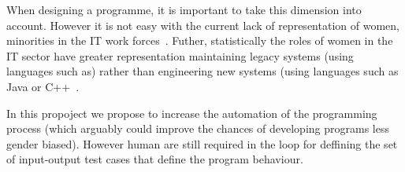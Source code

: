 \documentclass[10pt,a4paper]{paper}
\begin{document}
When designing a programme, it is important to take this dimension into account. However it is not easy with the current lack of representation of women, minorities in the IT work forces~\cite{arnold2001global}. Futher, statistically the roles of women in the IT sector have  greater representation  maintaining  legacy  systems  (using languages such as) rather than engineering new systems (using languages such as Java or C++~\cite{Dattero:2004:PLG:962081.962087}.

In this propoject we propose to increase the automation of the programming process (which arguably could improve the chances of developing programs less gender biased). However human are still required in the loop for deffining the set of input-output test cases that define the program behaviour.


\vspace{0.3cm}


\begin{scriptsize}

\end{scriptsize}

\end{document}
